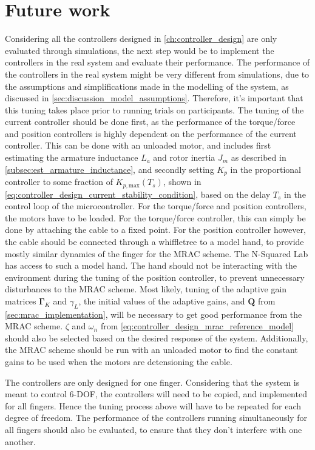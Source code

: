 \section{Future work}%
\label{sec:discussion_future_work}

Considering all the controllers designed in \cref{ch:controller_design} are only evaluated through simulations, the next step would be to implement the controllers in the real system and evaluate their performance. The performance of the controllers in the real system might be very different from simulations, due to the assumptions and simplifications made in the modelling of the system, as discussed in \cref{sec:discussion_model_assumptions}. Therefore, it's important that this tuning takes place prior to running trials on participants. The tuning of the current controller should be done first, as the performance of the torque/force and position controllers is highly dependent on the performance of the current controller. This can be done with an unloaded motor, and includes first estimating the armature inductance $L_a$ and rotor inertia $J_m$ as described in \cref{subsec:est_armature_inductance}, and secondly setting $K_p$ in the proportional controller to some fraction of $K_{p, \text{max}}(T_s)$, shown in \cref{eq:controller_design_current_stability_condition}, based on the delay $T_s$ in the control loop of the microcontroller. For the torque/force and position controllers, the motors have to be loaded. For the torque/force controller, this can simply be done by attaching the cable to a fixed point. For the position controller however, the cable should be connected through a whiffletree to a model hand, to provide mostly similar dynamics of the finger for the MRAC scheme. The N-Squared Lab has access to such a model hand. The hand should not be interacting with the environment during the tuning of the position controller, to prevent unnecessary disturbances to the MRAC scheme. Most likely, tuning of the adaptive gain matrices $\mathbf{\Gamma}_K$ and $\gamma_L$, the initial values of the adaptive gains, and $\mathbf{Q}$ from \cref{sec:mrac_implementation}, will be necessary to get good performance from the MRAC scheme. $\zeta$ and $\omega_n$ from \cref{eq:controller_design_mrac_reference_model} should also be selected based on the desired response of the system. Additionally, the MRAC scheme should be run with an unloaded motor to find the constant gains to be used when the motors are detensioning the cable.

The controllers are only designed for one finger. Considering that the system is meant to control \mbox{6-DOF}, the controllers will need to be copied, and implemented for all fingers. Hence the tuning process above will have to be repeated for each degree of freedom. The performance of the controllers running simultaneously for all fingers should also be evaluated, to ensure that they don't interfere with one another.

